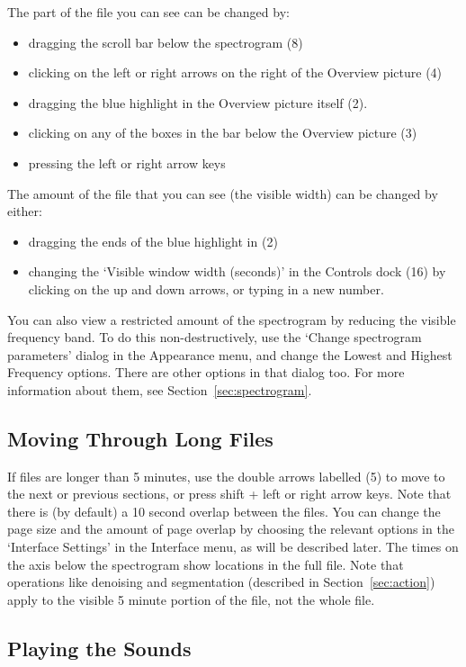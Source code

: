 \documentclass{article}
\begin{document}
The part of the file you can see can be changed by:
	\begin{itemize}
	\item dragging the scroll bar below the spectrogram (8)
	\item clicking on the left or right arrows on the right of the Overview picture (4)
	\item dragging the blue highlight in the Overview picture itself (2). 
	\item clicking on any of the boxes in the bar below the Overview picture (3)
	\item pressing the left or right arrow keys
	\end{itemize}
The amount of the file that you can see (the visible width) can be changed by either: 
	\begin{itemize}
	\item dragging the ends of the blue highlight in (2)
	\item changing the `Visible window width (seconds)' in the Controls dock (16) by clicking on the up and down arrows, or typing in a new number.
	\end{itemize}

You can also view a restricted amount of the spectrogram by reducing the visible frequency band. To do this non-destructively, use the `Change spectrogram parameters' dialog in the Appearance menu, and change the Lowest and Highest Frequency options. There are other options in that dialog too. For more information about them, see Section~\ref{sec:spectrogram}.

\subsection{Moving Through Long Files}

If files are longer than 5 minutes, use the double arrows labelled (5) to move to the next or previous sections, or press shift + left or right arrow keys. Note that there is (by default) a 10 second overlap between the files. You can change the page size and the amount of page overlap by choosing the relevant options in the `Interface Settings' in the Interface menu, as will be described later. The times on the axis below the spectrogram show locations in the full file. Note that operations like denoising and segmentation (described in Section~\ref{sec:action}) apply to the visible 5 minute portion of the file, not the whole file. 

\subsection{Playing the Sounds \label{sec:play}}
\end{document}
